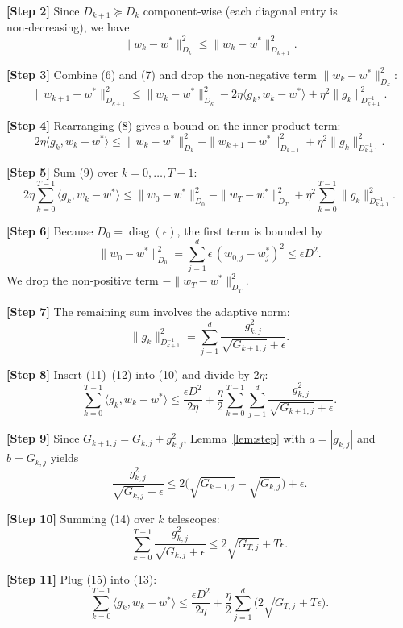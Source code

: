 \documentclass{article}
\newcommand{\inner}[2]{\langle #1,#2\rangle}
\begin{document}
\noindent\textbf{[Step 2]} Since $D_{k+1}\succeq D_{k}$ component‑wise (each diagonal entry is non‑decreasing), we have
\[
\|w_{k}-w^{*}\|_{D_{k}}^{2}\le\|w_{k}-w^{*}\|_{D_{k+1}}^{2}.
\tag{7}
\]

\noindent\textbf{[Step 3]} Combine (6) and (7) and drop the non‑negative term $\|w_{k}-w^{*}\|_{D_{k}}^{2}$:
\[
\|w_{k+1}-w^{*}\|_{D_{k+1}}^{2}
\le \|w_{k}-w^{*}\|_{D_{k}}^{2}
-2\eta\inner{g_{k}}{w_{k}-w^{*}}
+\eta^{2}\|g_{k}\|_{D_{k+1}^{-1}}^{2}.
\tag{8}
\]

\noindent\textbf{[Step 4]} Rearranging (8) gives a bound on the inner product term:
\[
2\eta\inner{g_{k}}{w_{k}-w^{*}}
\le \|w_{k}-w^{*}\|_{D_{k}}^{2}
-\|w_{k+1}-w^{*}\|_{D_{k+1}}^{2}
+\eta^{2}\|g_{k}\|_{D_{k+1}^{-1}}^{2}.
\tag{9}
\]

\noindent\textbf{[Step 5]} Sum (9) over $k=0,\dots,T-1$:
\[
2\eta\sum_{k=0}^{T-1}\inner{g_{k}}{w_{k}-w^{*}}
\le \|w_{0}-w^{*}\|_{D_{0}}^{2}
-\|w_{T}-w^{*}\|_{D_{T}}^{2}
+\eta^{2}\sum_{k=0}^{T-1}\|g_{k}\|_{D_{k+1}^{-1}}^{2}.
\tag{10}
\]

\noindent\textbf{[Step 6]} Because $D_{0}=\operatorname{diag}(\epsilon)$, the first term is bounded by
\[
\|w_{0}-w^{*}\|_{D_{0}}^{2}
= \sum_{j=1}^{d}\epsilon\,(w_{0,j}-w^{*}_{j})^{2}
\le \epsilon D^{2}.
\tag{11}
\]
We drop the non‑positive term $-\|w_{T}-w^{*}\|_{D_{T}}^{2}$.

\noindent\textbf{[Step 7]} The remaining sum involves the adaptive norm:
\[
\|g_{k}\|_{D_{k+1}^{-1}}^{2}
= \sum_{j=1}^{d}\frac{g_{k,j}^{2}}{\sqrt{G_{k+1,j}}+\epsilon}.
\tag{12}
\]

\noindent\textbf{[Step 8]} Insert (11)–(12) into (10) and divide by $2\eta$:
\[
\sum_{k=0}^{T-1}\inner{g_{k}}{w_{k}-w^{*}}
\le \frac{\epsilon D^{2}}{2\eta}
+\frac{\eta}{2}\sum_{k=0}^{T-1}\sum_{j=1}^{d}\frac{g_{k,j}^{2}}{\sqrt{G_{k+1,j}}+\epsilon}.
\tag{13}
\]

\noindent\textbf{[Step 9]} Since $G_{k+1,j}=G_{k,j}+g_{k,j}^{2}$, Lemma~\ref{lem:step} with $a=|g_{k,j}|$ and $b=G_{k,j}$ yields
\[
\frac{g_{k,j}^{2}}{\sqrt{G_{k,j}}+\epsilon}
\le 2\bigl(\sqrt{G_{k+1,j}}-\sqrt{G_{k,j}}\bigr)+\epsilon .
\tag{14}
\]

\noindent\textbf{[Step 10]} Summing (14) over $k$ telescopes:
\[
\sum_{k=0}^{T-1}\frac{g_{k,j}^{2}}{\sqrt{G_{k,j}}+\epsilon}
\le 2\sqrt{G_{T,j}}+T\epsilon .
\tag{15}
\]

\noindent\textbf{[Step 11]} Plug (15) into (13):
\[
\sum_{k=0}^{T-1}\inner{g_{k}}{w_{k}-w^{*}}
\le \frac{\epsilon D^{2}}{2\eta}
+\frac{\eta}{2}\sum_{j=1}^{d}\bigl(2\sqrt{G_{T,j}}+T\epsilon\bigr).
\tag{16}
\]
\end{document}
